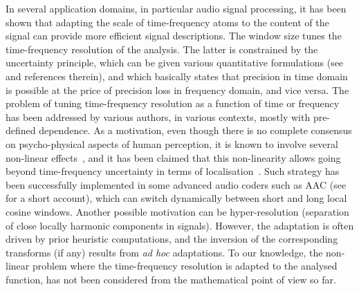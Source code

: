 In several application domains, in particular audio signal processing, it has been shown that adapting the scale of time-frequency atoms to the content of the signal can provide more efficient signal descriptions. The window size tunes the time-frequency resolution of the analysis. The latter is constrained by the uncertainty principle, which can be given various quantitative formulations (see~\cite{Folland1997uncertainty,Ricaud2013refined} and references therein), and which basically states that precision in time domain is possible at the price of precision loss in frequency domain, and vice versa. The problem of tuning time-frequency resolution as a function of time or frequency has been addressed by various authors, in various contexts, mostly with pre-defined dependence.  As a motivation, even though there is no complete consensus on psycho-physical aspects of human perception, it is known to involve several non-linear effects~\cite{Oxenham2018how}, and it has been claimed that this non-linearity allows going beyond time-frequency uncertainty in terms of localisation~\cite{Oppenheim2013human}. Such strategy has been successfully implemented in some advanced audio coders such as AAC (see~\cite{Brandenburg1999mp3} for a short account), which can switch dynamically between short and long local cosine windows. Another possible motivation can be  hyper-resolution (separation of close locally harmonic components in signals). However, the adaptation is often driven by prior heuristic computations, and the inversion of the corresponding transforms (if any) results from \textit{ad hoc} adaptations. To our knowledge, the non-linear problem where the time-frequency resolution is adapted to the analysed function, has not been considered from the mathematical point of view so far.

